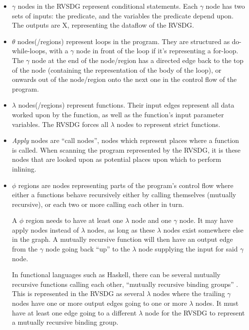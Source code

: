 \begin{itemize}

	\item \textit{$\gamma$} nodes in the RVSDG represent conditional statements.
Each $\gamma$ node has two sets of inputs: the predicate, and the
variables the predicate depend upon.
The outputs are X, representing the dataflow of the
RVSDG.

	\item \textit{$\theta$} nodes(/regions) represent loops in the program. They
are structured as do-while-loops, with a $\gamma$ node in front of the loop if
it's representing a for-loop. The $\gamma$ node at the end of the node/region
has a directed edge back to the top of the node (containing the representation
of the body of the loop), or onwards out of the node/region onto the next one in
the control flow of the program.

	\item \textit{$\lambda$} nodes(/regions) represent functions. Their input
edges represent all data worked upon by the function, as well as the function's
input parameter variables. The RVSDG forces all $\lambda$ nodes to represent
strict functions.

	\item \textit{Apply} nodes are ``call nodes'', nodes which represent places
where a function is called. When scanning the program represented by the RVSDG,
it is these nodes that are looked upon as potential places upon which to perform
inlining.

	\item \textit{$\phi$} regions are nodes representing parts of the program's
control flow where either a functions behave recursively either by calling
themselves (mutually recursive), or each two or more calling each other in turn.

A $\phi$ region needs to have at least one $\lambda$ node and one $\gamma$ node.
It may have apply nodes instead of $\lambda$ nodes, as long as these $\lambda$
nodes exist somewhere else in the graph. A mutually recursive function will then
have an output edge from the $\gamma$ node going back ``up'' to the $\lambda$
node supplying the input for said $\gamma$ node.

In functional languages such as Haskell, there can be several mutually recursive
functions calling each other, ``mutually recursive binding groups''
\cite{GHCPaper}. This is represented in the RVSDG as several $\lambda$ nodes
where the trailing $\gamma$ nodes have one or more output edges going to one or
more $\lambda$ nodes. It must have at least one edge going to a different
$\lambda$ node for the RVSDG to represent a mutually recursive binding group.

\end{itemize}
